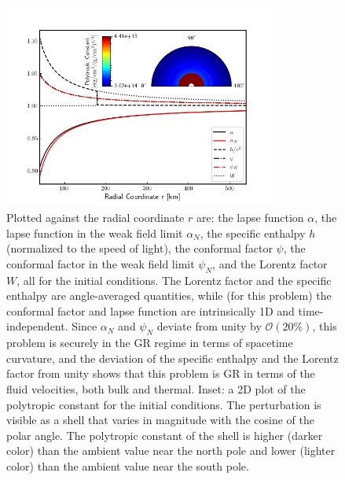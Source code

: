 \documentclass[letterpaper]{jpconf}
\begin{document}
\begin{figure}
\centering
\includegraphics[width=0.8\textwidth]{Images/GR1D.png}
\caption{Plotted against the radial coordinate $r$ are: the lapse function $\alpha$, the lapse function in the weak field limit $\alpha_{N}$, the specific enthalpy $h$ (normalized to the speed of light), the conformal factor $\psi$, the conformal factor in the weak field limit $\psi_{N}$, and the Lorentz factor $W$, all for the initial conditions. The Lorentz factor and the specific enthalpy are angle-averaged quantities, while (for this problem) the conformal factor and lapse function are intrinsically 1D and time-independent. Since $\alpha_{N}$ and $\psi_{N}$ deviate from unity by $\mathcal{O}\left(20\%\right)$, this problem is securely in the GR regime in terms of spacetime curvature, and the deviation of the specific enthalpy and the Lorentz factor from unity shows that this problem is GR in terms of the fluid velocities, both bulk and thermal. Inset: a 2D plot of the polytropic constant for the initial conditions. The perturbation is visible as a shell that varies in magnitude with the cosine of the polar angle. The polytropic constant of the shell is higher (darker color) than the ambient value near the north pole and lower (lighter color) than the ambient value near the south pole.}
\label{Fig:GR1D}
\end{figure}
\end{document}
